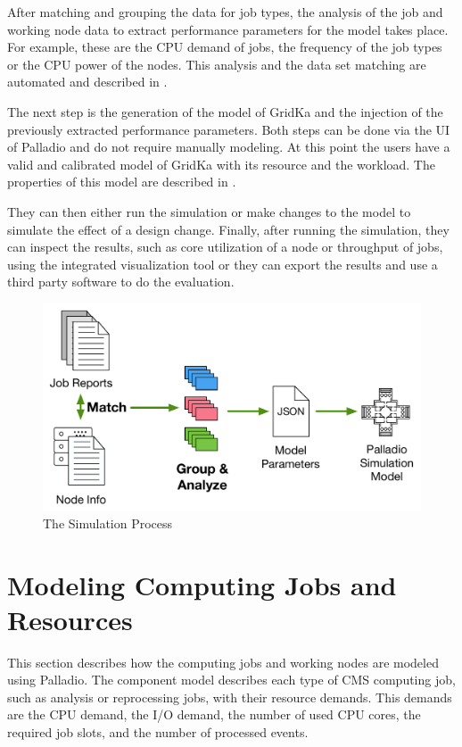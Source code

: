 \documentclass[a4paper]{jpconf}
\begin{document}
After matching and grouping the data for job types, the analysis of the job and working node data to extract performance parameters for the model takes place. For example, these are the CPU demand of jobs, the frequency of the job types or the CPU power of the nodes. This analysis and the data set matching are automated and described in .

The next step is the generation of the model of GridKa and the injection of the previously extracted performance parameters. Both steps can be done via the UI of Palladio and do not require manually modeling. At this point the users have a valid and calibrated model of GridKa with its resource and the workload. The properties of this model are described in .

They can then either run the simulation or make changes to the model to simulate the effect of a design change. 
Finally, after running the simulation, they can inspect the results, such as core utilization of a node or throughput of jobs, using the integrated visualization tool or they can export the results and use a third party software to do the evaluation.

\begin{figure}
	\centering
	\includegraphics[scale = 0.4]{images/process}
	\caption[]{The Simulation Process}
	\label{process}
\end{figure}


\section{Modeling Computing Jobs and Resources}
\label{sec:model}
This section describes how the computing jobs and working nodes are modeled using Palladio.
The component model describes each type of CMS computing job, such as analysis or reprocessing jobs, with their resource demands. This demands are the CPU demand, the I/O demand, the number of used CPU cores, the required job slots, and the number of processed events.
\end{document}

